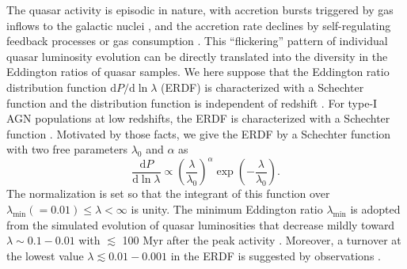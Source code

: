 \documentclass[twocolumn, twocolappendix]{aastex63}
\newcommand{\D}{\mathrm{d}}
\begin{document}
\begin{CJK*}{UTF8}{gbsn}
The quasar activity is episodic in nature, with accretion bursts triggered by gas inflows to the galactic nuclei
\citep{2005Natur.433..604D,2005ApJ...630..705H}, 
and the accretion rate declines by self-regulating feedback processes \citep[e.g.,][]{2008ApJ...686..815Y,2011ApJ...737...26N} 
or gas consumption \citep{1991MNRAS.248..754P,2005ApJ...634..901Y,2007MNRAS.377L..25K}. 
This ``flickering'' pattern of individual quasar luminosity evolution can be directly translated into the diversity 
in the Eddington ratios of quasar samples. 
We here suppose that the Eddington ratio distribution function $\D P/ \D\ln\lambda$ (ERDF) is characterized
with a Schechter function and the distribution function is independent of redshift 
\citep{2006ApJ...639..700H,2009ApJ...698.1550H}.
%
For type-I AGN populations at low redshifts, the ERDF is characterized with a Schechter function
\citep{2015MNRAS.447.2085S,2016ApJ...826...12J,2018MNRAS.474.1225A}.
Motivated by those facts, we give the ERDF by a Schechter function with two free parameters $\lambda_0$ and $\alpha$ as
\begin{equation}
  \label{eq:Pl}
  \frac{\D P}{ \D \ln \lambda} \propto
  \left(\frac{\lambda} {\lambda_0} \right)^\alpha \exp{\left(-\frac{\lambda}{\lambda_0}\right)}.
\end{equation}
The normalization is set so that the integrant of this function over $\lambda_\mathrm{min}(=0.01) \leq \lambda < \infty$ is unity.
The minimum Eddington ratio $\lambda_\mathrm{min}$ is adopted from the simulated evolution of quasar luminosities 
that decrease mildly toward $\lambda \sim 0.1-0.01$ with $\lesssim$ 100 Myr after the peak activity \citep{2011ApJ...737...26N}.
Moreover, a turnover at the lowest value $\lambda\lesssim 0.01-0.001$ in the ERDF is suggested by observations \citep{2018MNRAS.474.1225A}.  




\end{CJK*}
\end{document}
